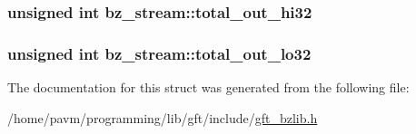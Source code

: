\hypertarget{structbz__stream_a8906ddf3e4fcc6963ef6680157647001}{
\subsubsection[{total\-\_\-out\-\_\-hi32}]{\setlength{\rightskip}{0pt plus 5cm}unsigned int bz\-\_\-stream\-::total\-\_\-out\-\_\-hi32}}\label{structbz__stream_a8906ddf3e4fcc6963ef6680157647001}
\hypertarget{structbz__stream_a7befd6f6ace94f7df3aac07ad48f944b}{
\subsubsection[{total\-\_\-out\-\_\-lo32}]{\setlength{\rightskip}{0pt plus 5cm}unsigned int bz\-\_\-stream\-::total\-\_\-out\-\_\-lo32}}\label{structbz__stream_a7befd6f6ace94f7df3aac07ad48f944b}


The documentation for this struct was generated from the following file\-:\begin{DoxyCompactItemize}
\item 
/home/pavm/programming/lib/gft/include/\hyperlink{gft__bzlib_8h}{gft\-\_\-bzlib.\-h}\end{DoxyCompactItemize}

